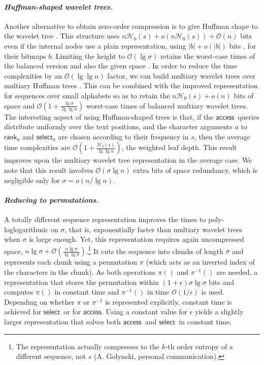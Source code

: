 \documentclass[11pt]{article}
\providecommand{\pii}{\ensuremath{\pi^{-1}}}
\newcommand{\Oh}[1]
    {\ensuremath{\mathcal{O}\left( {#1} \right)}}
\newcommand{\access}
    {\ensuremath{\mathsf{access}}}
\newcommand{\rank}
    {\ensuremath{\mathsf{rank}}}
\newcommand{\select}
    {\ensuremath{\mathsf{select}}}
\newcommand{\HH}{\mathcal{H}}
\newcommand{\Ho}{\HH_0}
\begin{document}
\paragraph{\em Huffman-shaped wavelet trees.}
Another alternative to obtain zero-order compression is to give
Huffman shape to the wavelet tree \cite{GGV03}. This structure uses
$n\Ho(s)+o(n\Ho(s))+\Oh{n}$ bits even if the internal nodes use a plain 
representation, using $|b|+o(|b|)$ bits \cite{Cla96,Mun96}, for their 
bitmaps $b$. Limiting the height to $\Oh{\lg\sigma}$ retains the worst-case 
times of the balanced version and also the given space \cite{BN11}. In order 
to reduce the time complexities by
an $\Oh{\lg\lg n}$ factor, we can build multiary wavelet trees over
multiary Huffman trees \cite{Huf52}.  This can be combined with the
improved representation for sequences over small alphabets
\cite{GRR08} so as to retain the $n\Ho(s)+o(n)$ bits of space and
$\Oh{1+\frac{\lg\sigma}{\lg\lg n}}$ worst-case times of balanced
multiary wavelet trees. The interesting aspect of using Huffman-shaped
trees is that, if the \access\ queries distribute uniformly over the
text positions, and the character arguments $a$ to $\rank_a$ and
$\select_a$ are chosen according to their frequency in $s$, then the
average time complexities are $\Oh{1+\frac{\Ho(s)}{\lg\lg n}}$, the
weighted leaf depth. This result \cite[Thm.~5]{BN11} improves upon the
multiary wavelet tree representation \cite{GRR08} in the average case.
We note that this result \cite{BN11} involves $\Oh{\sigma\lg n}$ extra
bits of space redundancy, which is negligible only for $\sigma =
o(n/\lg n)$.

\paragraph{\em Reducing to permutations.}
A totally different sequence representation \cite{GMR06} improves the
times to poly-loglogarithmic on $\sigma$, that is, exponentially
faster than multiary wavelet trees when $\sigma$ is large enough. Yet,
this representation requires again uncompressed space, $n\lg\sigma +
\Oh{\frac{n\lg\sigma}{\lg\lg\sigma}}$.\footnote{The representation actually compresses to the $k$-th order
  entropy of a different sequence, not $s$ (A. Golynski, personal
  communication).}  It cuts the sequence into chunks of length
$\sigma$ and represents each chunk using a permutation $\pi$ (which
acts as an inverted index of the characters in the chunk). As both
operations $\pi()$ and $\pii()$ are needed, a representation
\cite{MRRR03} that stores the permutation within
$(1+\epsilon)\sigma\lg\sigma$ bits and computes $\pi()$ in constant
time and $\pii()$ in time $\Oh{1/\epsilon}$ is used. Depending on
whether $\pi$ or $\pii$ is represented explicitly, constant time is
achieved for \select\ or for \access. Using a constant value for
$\epsilon$ yields a slightly larger representation that solves both
\access\ and \select\ in constant time.
\end{document}
